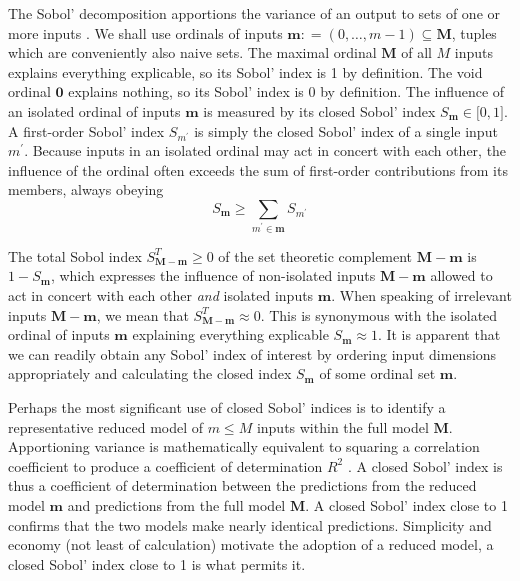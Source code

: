 \documentclass[preprint,12pt]{elsarticle}
\newcommand*{\M}[1]{\ensuremath{#1}\xspace}
\newcommand*{\mi}[1]{\mathbf{#1}}
\newcommand*{\deq}{\M{\mathrel{\mathop:}=}}
\begin{document}
    The Sobol' decomposition apportions the variance of an output to sets of one or more inputs \cite{Sobol2001}. We shall use ordinals of inputs $\mi{m}\deq(0,\ldots ,m-1) \subseteq \mi{M}$, tuples which are conveniently also naive sets. The maximal ordinal $\mi{M}$ of all $M$ inputs explains everything explicable, so its Sobol' index is 1 by definition. The void ordinal $\mi{0}$ explains nothing, so its Sobol' index is 0 by definition. 
    The influence of an isolated ordinal of inputs $\mi{m}$ is measured by its closed Sobol' index $S_{\mi{m}} \in \lbrack 0,1\rbrack$. A first-order Sobol' index $S_{m^{\prime}}$ is simply the closed Sobol' index of a single input $m^{\prime}$.
    Because inputs in an isolated ordinal may act in concert with each other, the influence of the ordinal often exceeds the sum of first-order contributions from its members, always obeying 
    \begin{equation*}
        S_{\mi{m}} \geq \sum_{m^{\prime} \in \mi{m}} S_{m^{\prime}}
    \end{equation*}

    The total Sobol index $S^{T}_{\mi{M-m}} \geq 0$ of the set theoretic complement $\mi{M-m}$ is $1-S_{\mi{m}}$, which expresses the influence of non-isolated inputs $\mi{M-m}$ allowed to act in concert with each other \emph{and} isolated inputs $\mi{m}$. When speaking of irrelevant inputs $\mi{M-m}$, we mean that $S^{T}_{\mi{M-m}} \approx 0$. This is synonymous with the isolated ordinal of inputs $\mi{m}$ explaining everything explicable $S_{\mi{m}}\approx 1$.
    It is apparent that we can readily obtain any Sobol' index of interest by ordering input dimensions appropriately and calculating the closed index $S_{\mi{m}}$ of some ordinal set $\mi{m}$.

    Perhaps the most significant use of closed Sobol' indices is to identify a representative reduced model of $m\leq M$ inputs within the full model $\mi{M}$.
    Apportioning variance is mathematically equivalent to squaring a correlation coefficient to produce a coefficient of determination $R^{2}$ \cite{Chicco2021}. A closed Sobol' index is thus a coefficient of determination between the predictions from the reduced model $\mi{m}$ and predictions from the full model $\mi{M}$. A closed Sobol' index close to 1 confirms that the two models make nearly identical predictions. Simplicity and economy (not least of calculation) motivate the adoption of a reduced model, a closed Sobol' index close to 1 is what permits it.
\end{document}
